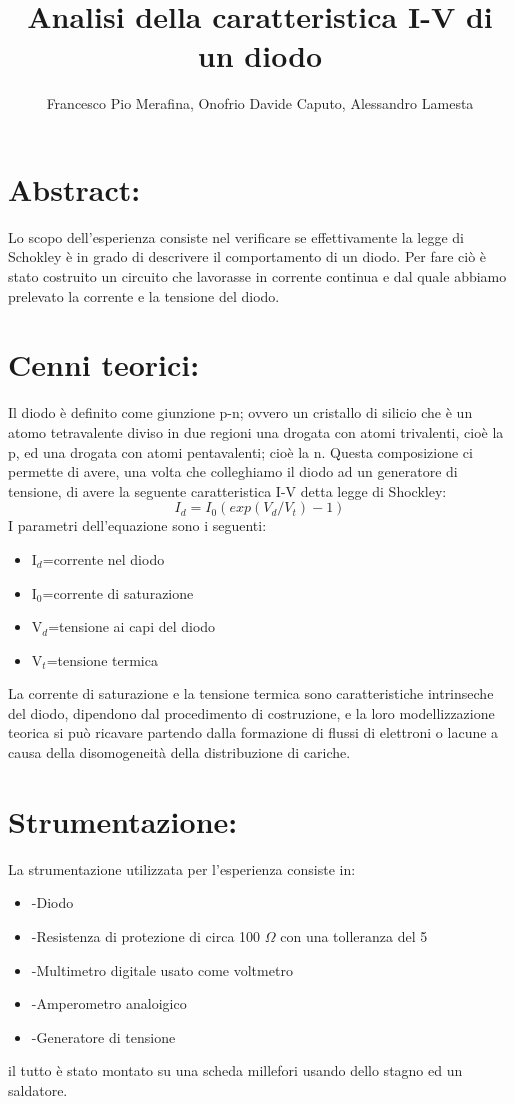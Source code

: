 \documentclass{article}
\title{Analisi della caratteristica I-V di un diodo}
\author{Francesco Pio Merafina, Onofrio Davide Caputo, Alessandro Lamesta}
\begin{document}
\maketitle
\section{Abstract:}
Lo scopo dell'esperienza consiste nel verificare se effettivamente la legge di Schokley è in grado di descrivere il comportamento di un diodo. Per fare ciò è stato costruito un circuito che lavorasse in corrente continua e dal quale abbiamo prelevato la corrente e la tensione del diodo.
~
\section{Cenni teorici:}
Il diodo è definito come giunzione p-n; ovvero un cristallo di silicio che è un atomo tetravalente diviso in due regioni una drogata con atomi trivalenti, cioè la p, ed una drogata con atomi pentavalenti; cioè la n. Questa composizione ci permette di avere, una volta che colleghiamo il diodo ad un generatore di tensione, di avere la seguente caratteristica I-V detta legge di Shockley:
\begin{equation}
    I_d=I_0(exp(V_d/V_t)-1)
\end{equation}
I parametri dell'equazione sono i seguenti:
\begin{itemize}
    \item I$_{d}$=corrente nel diodo
    \item I$_{0}$=corrente di saturazione
    \item V$_{d}$=tensione ai capi del diodo
    \item V$_{t}$=tensione termica
\end{itemize}
La corrente di saturazione e la tensione termica sono caratteristiche intrinseche del diodo, dipendono dal procedimento di costruzione, e la loro modellizzazione teorica si può ricavare partendo dalla formazione di flussi di elettroni o lacune a causa della disomogeneità della distribuzione di cariche.
~
\section{Strumentazione:}
La strumentazione utilizzata per l'esperienza consiste in:
\begin{itemize}
    \item -Diodo
    \item -Resistenza di protezione di circa 100 $\Omega$ con una tolleranza del 5%
    \item -Multimetro digitale usato come voltmetro
    \item -Amperometro analoigico
    \item -Generatore di tensione
\end{itemize}
il tutto è stato montato su una scheda millefori usando dello stagno ed un saldatore.
~
\end{document}
